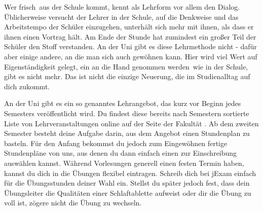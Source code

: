 

Wer \glqq frisch\grqq\ aus der Schule kommt, kennt als Lehrform vor allem den Dialog.
Üblicherweise versucht der Lehrer in der Schule, auf die Denkweise und das Arbeitstempo der Schüler einzugehen, unterhält sich mehr mit ihnen, als dass er ihnen einen Vortrag hält.
Am Ende der Stunde hat zumindest ein großer Teil der Schüler den Stoff verstanden.
An der Uni gibt es diese Lehrmethode nicht - dafür aber einige andere, an die man sich auch gewöhnen kann.
Hier wird viel Wert auf Eigenständigkeit gelegt, ein \glqq an die Hand genommen werden\grqq\ wie in der Schule, gibt es nicht mehr.
Das ist nicht die einzige Neuerung, die im Studienalltag auf dich zukommt.


An der Uni gibt es ein so genanntes Lehrangebot, das kurz vor Beginn jedes Semesters veröffentlicht wird.
Du findest diese bereits nach Semestern sortierte Liste von Lehrveranstaltungen online auf der Seite der Fakultät .
Ab dem zweiten Semester besteht deine Aufgabe darin, aus dem Angebot einen Stundenplan zu basteln.
Für den Anfang bekommst du jedoch zum Eingewöhnen fertige Stundenpläne von uns, aus denen du dann einfach einen zur Einschreibung auswählen kannst.
Während Vorlesungen generell einen festen Termin haben, kannst du dich in die Übungen flexibel eintragen.
Schreib dich bei jExam  einfach für die Übungsstunden deiner Wahl ein.
Stellst du später jedoch fest, dass dein Übungsleiter die Qualitäten einer Schlaftablette aufweist oder dir die Übung zu voll ist, zögere nicht die Übung zu wechseln.



